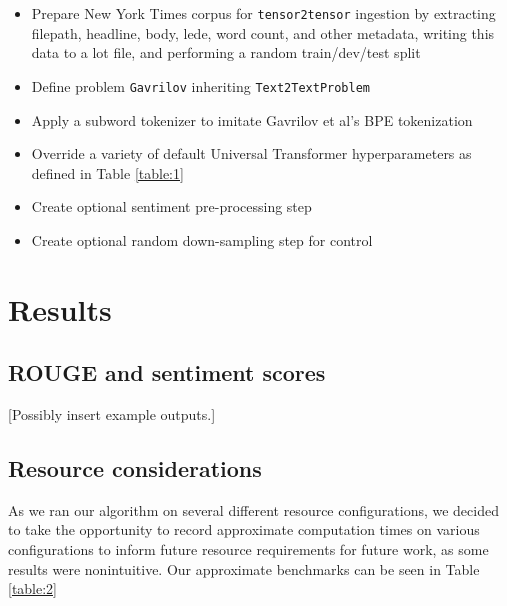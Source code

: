 \documentclass[11pt]{article}
\begin{document}
\begin{itemize}
    \item Prepare New York Times corpus for \texttt{tensor2tensor} ingestion by extracting filepath, headline, body, lede, word count, and other metadata, writing this data to a lot file, and performing a random train/dev/test split
    \item Define problem \texttt{Gavrilov} inheriting \texttt{Text2TextProblem}
    \item Apply a subword tokenizer to imitate Gavrilov et al's BPE tokenization
    \item Override a variety of default Universal Transformer hyperparameters as defined in Table \ref{table:1}
    \item Create optional sentiment pre-processing step
    \item Create optional random down-sampling step for control
\end{itemize}

\section{Results}
\subsection{ROUGE and sentiment scores}

[Possibly insert example outputs.]

\subsection{Resource considerations}

As we ran our algorithm on several different resource configurations, we decided to take the opportunity to record approximate computation times on various configurations to inform future resource requirements for future work, as some results were nonintuitive. Our approximate benchmarks can be seen in Table \ref{table:2}
\end{document}
